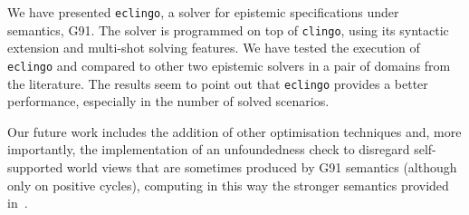 \documentclass{new_tlp}
\def\eclingo{{\tt eclingo}}
\def\clingo{{\tt clingo}}
\begin{document}
We have presented \eclingo{}, a solver for epistemic specifications under~\cite{gelfond91a} semantics, G91.
%
The solver is programmed on top of \clingo, using its syntactic extension and multi-shot solving features.
%
We have tested the execution of \eclingo{} and compared to other two epistemic solvers in a pair of domains from the literature.
%
The results seem to point out that \eclingo{} provides a better performance, especially in the number of solved scenarios.

Our future work includes the addition of other optimisation techniques and, more importantly, the implementation of an unfoundedness check to disregard self-supported world views that are sometimes produced by G91 semantics (although only on positive cycles), computing in this way the stronger semantics provided in~\cite{cafafa19b}.



\end{document}
